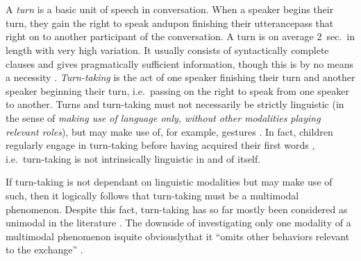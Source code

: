 
\chapter{\introduction}
\label{ch:introduction}
A \emph{turn} is a basic unit of speech in conversation.
When a speaker begins their turn, they gain the right to speak and\dash upon finishing their utterance\dash pass that right on to another participant of the conversation.
A turn is on average 2~sec.\ in length with very high variation.
It usually consists of syntactically complete clauses and gives pragmatically sufficient information, though this is by no means a necessity \citep[]{levinson_turn-taking_2016}.
\emph{Turn-taking} is the act of one speaker finishing their turn and another speaker beginning their turn, i.e.\ passing on the right to speak from one speaker to another. %
Turns and turn-taking must not necessarily be strictly linguistic (in the sense of \emph{making use of language only, without other modalities playing relevant roles}), but may make use of, for example, gestures \citep[]{schmitt_zur_2005}.
In fact, children regularly engage in turn-taking before having acquired their first words \citep[]{casillas_turn-taking_2016}, i.e.\ turn-taking is not intrinsically linguistic in and of itself.

If turn-taking is not dependant on linguistic modalities but may make use of such, then it logically follows that turn-taking must be a multimodal phenomenon.
Despite this fact, turn-taking has so far mostly been considered as unimodal in the literature \citep[]{rohlfing_multimodal_nodate}.
The downside of investigating only one modality of a multimodal phenomenon is\dash quite obviously\dash that it ``omits other behaviors relevant to the exchange'' \citep[]{rohlfing_multimodal_nodate}.

